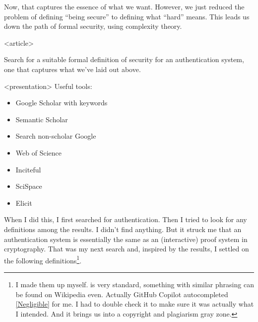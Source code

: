 Now, that captures the essence of what we want.
However, we just reduced the problem of defining \enquote{being secure} to 
defining what \enquote{hard} means.
This leads us down the path of formal security, \eg using complexity theory.

\begin{frame}<article>
\begin{exercise}
  Search for a suitable formal definition of security for an authentication 
  system, one that captures what we've laid out above.
\end{exercise}

\begin{example}<presentation>
  Useful tools:
  \begin{itemize}
    \item Google Scholar with keywords
    \item Semantic Scholar
    \item Search non-scholar Google
    \item Web of Science
    \item Inciteful
    \item SciSpace
    \item Elicit
  \end{itemize}
\end{example}
\end{frame}

When I did this, I first searched for authentication.
Then I tried to look for any definitions among the results.
I didn't find anything.
But it struck me that an authentication system is essentially the same as an 
(interactive) proof system in cryptography.
That was my next search and, inspired by the results, I settled on the 
following definitions\footnote{%
   I made them up myself.
   is very standard, something with similar phrasing can be 
  found on Wikipedia even.
  Actually GitHub Copilot autocompleted \cref{Negligible} for me.
  I had to double check it to make sure it was actually what I intended.
  And it brings us into a copyright and plagiarism gray zone.
}.

